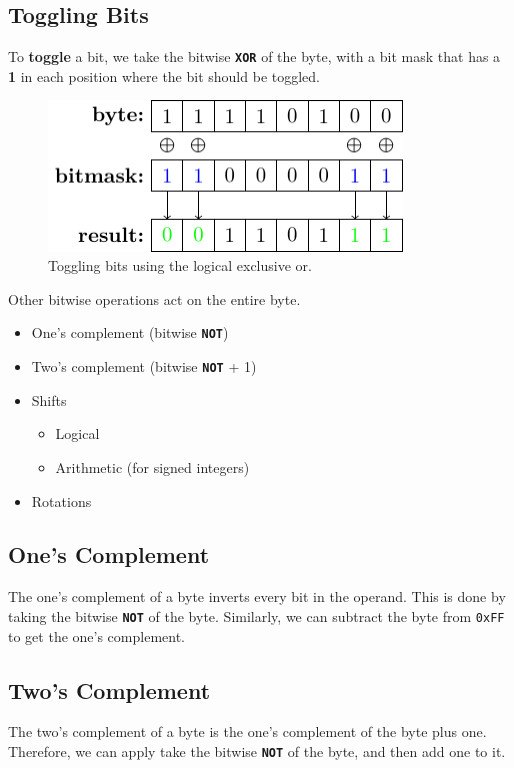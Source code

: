\documentclass[a4paper]{report}
\newcommand{\keywordinline}[1]{\textcolor[rgb]{0.00,0.50,0.00}{\textbf{\texttt{#1}}}}
\begin{document}
\subsection{Toggling Bits}
To \textbf{toggle} a bit, we take the bitwise \keywordinline{XOR} of the byte, with a bit mask
that has a \textbf{1} in each position where the bit should be toggled.
\begin{figure}[H]
    \centering
    \includegraphics[height = 4cm, keepaspectratio = true]{figures/bit_toggle.pdf}
    \caption{Toggling bits using the logical exclusive or.} %
\end{figure}
Other bitwise operations act on the entire byte.
\begin{itemize}
    \item One's complement (bitwise \keywordinline{NOT})
    \item Two's complement (bitwise \keywordinline{NOT} + 1)
    \item Shifts
          \begin{itemize}
              \item Logical
              \item Arithmetic (for signed integers)
          \end{itemize}
    \item Rotations
\end{itemize}
\subsection{One's Complement}
The one's complement of a byte inverts every bit in the operand. This is done by
taking the bitwise \keywordinline{NOT} of the byte.
Similarly, we can subtract the byte from \texttt{0xFF} to get the one's complement.
\subsection{Two's Complement}
The two's complement of a byte is the one's complement of the byte plus one.
Therefore, we can apply take the bitwise \keywordinline{NOT} of the byte, and then add one to it.
\end{document}
